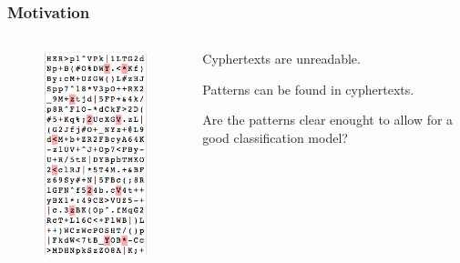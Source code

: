 \documentclass{beamer}
\begin{document}

\begin{frame}
\frametitle{Motivation}

\begin{columns}[onlytextwidth]
  \begin{column}{0.3\textwidth}
  	\begin{figure}
		\includegraphics[scale=0.3]{cyphertext.png}
		\centering
	\end{figure}
  \end{column}
  
  \begin{column}{0.7\textwidth}
  	\pause
  	\begin{block}{}
  		Cyphertexts are unreadable.
  	\end{block}
  	
  	\pause
  	\begin{block}{}
  		Patterns can be found in cyphertexts.
  	\end{block}
  	
  	\pause
  	\begin{block}{}
  		Are the patterns clear enought to allow for a good classification model?
  	\end{block}
  \end{column}
\end{columns}

\end{frame}
\end{document}
